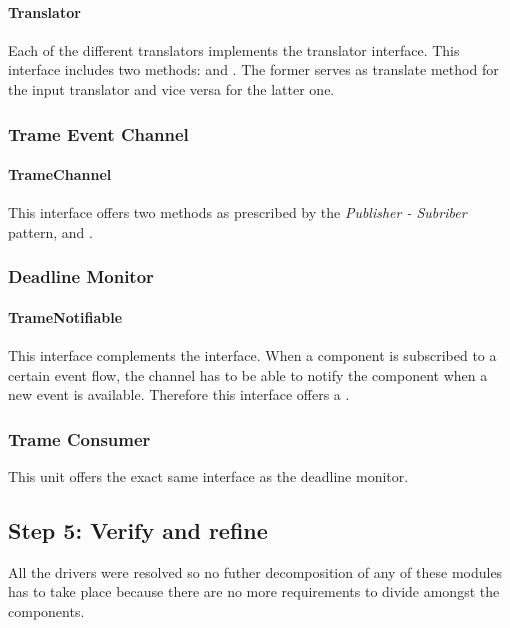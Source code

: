 \paragraph{Translator} %

\npar Each of the different translators implements the 
translator interface. This interface includes two methods:
 and
. The former serves as translate method
for the input translator and vice versa for the latter one.

\subsubsection{Trame Event Channel}

\paragraph{TrameChannel} %

\npar This interface offers two methods as prescribed by the \emph{Publisher -
Subriber} pattern,  and .

\subsubsection{Deadline Monitor}

\paragraph{TrameNotifiable}

\npar This interface complements the  interface. When a
component is subscribed to a certain event flow, the channel has to be able to
notify the component when a new event is available. Therefore this interface
offers a .

\subsubsection{Trame Consumer}

\npar This unit offers the exact same interface as the deadline monitor.


\subsection{Step 5: Verify and refine}
\label{add:it2/verification}

\npar All the drivers were resolved so no futher decomposition of any of these
modules has to take place because there are no more requirements to divide
amongst the components. 
